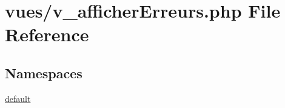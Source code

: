 \hypertarget{v__afficher_erreurs_8php}{}\section{vues/v\+\_\+afficher\+Erreurs.php File Reference}
\label{v__afficher_erreurs_8php}
\subsection*{Namespaces}
\begin{DoxyCompactItemize}
\item 
 \hyperlink{namespacedefault}{default}
\end{DoxyCompactItemize}
